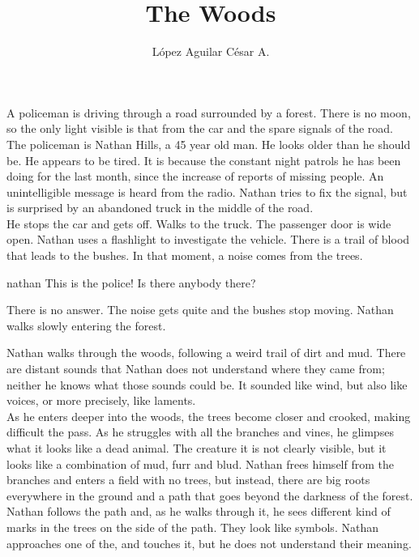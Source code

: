 \documentclass{screenplay}
\title{The Woods}
\author{López Aguilar César A.}
\begin{document}
\coverpage


\fadein

A policeman is driving through a road surrounded by a forest. There is no moon, so the only light visible is that from the car and the spare signals of the road. The policeman is Nathan Hills, a 45 year old man. He looks older than he should be. He appears to be tired. It is because the constant night patrols he has been doing for the last month, since the increase of reports of missing people. An unintelligible message is heard from the radio. Nathan tries to fix the signal, but is surprised by an abandoned truck in the middle of the road. \\
He stops the car and gets off. Walks to the truck. The passenger door is wide open. Nathan uses a flashlight to investigate the vehicle. There is a trail of blood that leads to the bushes. In that moment, a noise comes from the trees. 

\begin{dialogue}[Shouting]{nathan}
This is the police! Is there anybody there?
\end{dialogue}

There is no answer. The noise gets quite and the bushes stop moving. Nathan walks slowly entering the forest. 

Nathan walks through the woods, following a weird trail of dirt and mud. There are distant sounds that Nathan does not understand where they came from; neither he knows what those sounds could be. It sounded like wind, but also like voices, or more precisely, like laments. \\
As he enters deeper into the woods, the trees become closer and crooked, making difficult the pass. As he struggles with all the branches and vines, he glimpses what it looks like a dead animal. The creature it is not clearly visible, but it looks like a combination of mud, furr and blud. Nathan frees himself from the branches and enters a field with no trees, but instead, there are big roots everywhere in the ground and a path that goes beyond the darkness of the forest. \\
Nathan follows the path and, as he walks through it, he sees different kind of marks in the trees on the side of the path. They look like symbols. Nathan approaches one of the, and touches it, but he does not understand their meaning.






\fadeout
\end{document}
